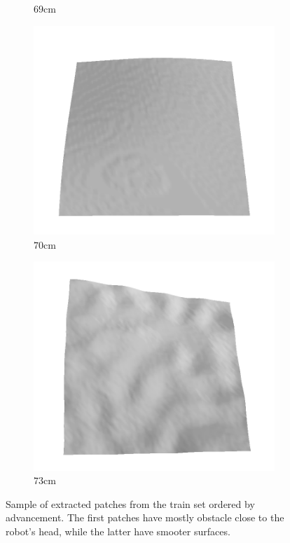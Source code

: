 \documentclass[../document.tex]{subfiles}
\begin{document}
\begin{figure}[htbp]
\begin{subfigure}[b]{0.19\textwidth}
    \caption{$69$cm}
    \end{subfigure}
    \begin{subfigure}[b]{0.19\textwidth}
    \includegraphics[width=\linewidth]{../img/5/train/all/70-patch-3d-majavi-38.png}
    \caption{$70$cm}
    \end{subfigure}
    \begin{subfigure}[b]{0.19\textwidth}
    \includegraphics[width=\linewidth]{../img/5/train/all/73-patch-3d-majavi-39.png}
    \caption{$73$cm}
    \end{subfigure}
    \caption{Sample of extracted patches from the train set ordered by advancement. The first patches have mostly obstacle close to the robot's head, while the latter have smooter surfaces.}
    \label{fig : train-patches-sample}
    \end{figure}
\end{document}
